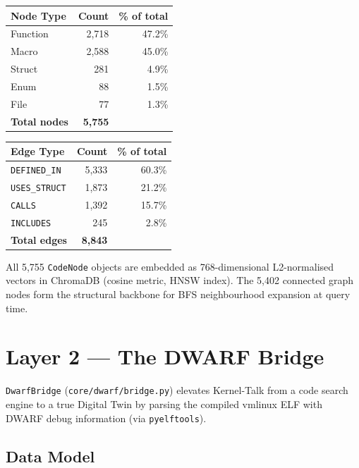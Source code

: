 \documentclass[11pt,a4paper]{article}
\newcommand{\coderef}[1]{\texttt{\small\color{layer2}#1}}
\begin{document}
\begin{center}
\renewcommand{\arraystretch}{1.2}
\begin{tabular}{@{}lrr@{}}
\toprule
\textbf{Node Type} & \textbf{Count} & \textbf{\% of total} \\
\midrule
Function        & 2{,}718 & 47.2\% \\
Macro           & 2{,}588 & 45.0\% \\
Struct          &   281   &  4.9\% \\
Enum            &    88   &  1.5\% \\
File            &    77   &  1.3\% \\
\midrule
\textbf{Total nodes}  & \textbf{5{,}755} & \\
\bottomrule
\end{tabular}
\quad
\begin{tabular}{@{}lrr@{}}
\toprule
\textbf{Edge Type} & \textbf{Count} & \textbf{\% of total} \\
\midrule
\texttt{DEFINED\_IN}  & 5{,}333 & 60.3\% \\
\texttt{USES\_STRUCT} & 1{,}873 & 21.2\% \\
\texttt{CALLS}        & 1{,}392 & 15.7\% \\
\texttt{INCLUDES}     &   245   &  2.8\% \\
\midrule
\textbf{Total edges}  & \textbf{8{,}843} & \\
\bottomrule
\end{tabular}
\end{center}

\noindent
All 5{,}755 \coderef{CodeNode} objects are embedded as 768-dimensional
L2-normalised vectors in ChromaDB (cosine metric, HNSW index).
The 5{,}402 connected graph nodes form the structural backbone for
BFS neighbourhood expansion at query time.

\section{Layer 2 --- The DWARF Bridge}
\label{sec:dwarf}

\coderef{DwarfBridge} (\texttt{core/dwarf/bridge.py}) elevates Kernel-Talk
from a code search engine to a true Digital Twin by parsing the compiled
vmlinux ELF with DWARF debug information (via \texttt{pyelftools}).

\subsection{Data Model}
\end{document}
